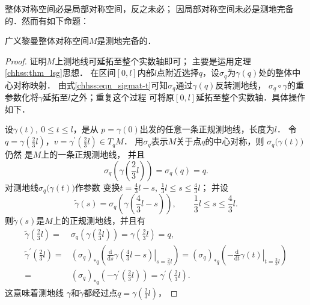 整体对称空间必是局部对称空间，反之未必；
因局部对称空间未必是测地完备的．然而有如下命题：
\begin{theorem}\label{chhss:thm_SSC}
    广义黎曼整体对称空间$M$是测地完备的．
\end{theorem}
\begin{proof}
    证明$M$上测地线可延拓至整个实数轴即可；
    主要是运用定理\ref{chhss:thm_lsg}思想． %
    在区间$[0,l]$内部$l$点附近选择$q$，设$\sigma_q$为$\gamma(q)$处的整体中心对称映射．
    由式\eqref{chhss:eqn_sigmat-t}可知$\sigma_q$通过$\gamma(q)$反转测地线，
    $\sigma_q \circ \gamma$的重参数化将$\gamma$延拓至$l$之外；重复这个过程
    可将原$[0,l]$延拓至整个实数轴．具体操作如下．

    设$\gamma(t),\ 0 \leqslant t \leqslant l$，是从 $p=\gamma(0)$出发的任意一条正规测地线，长度为$l$．
    令$q=\gamma(\frac{2}{3} l)$，$v=\gamma^{\prime}(\frac{2}{3} l) \in T_q M$．
    用$\sigma_q$表示$M$关于点$q$的中心对称，则 $\sigma_q\bigl(\gamma(t)\bigr)$仍然
    是$M$上的一条正规测地线，   并且
    \begin{equation*}
        \sigma_q\left(\gamma\left(\frac{2}{3} l\right)\right)=\sigma_q(q)=q .
    \end{equation*}
    对测地线$\sigma_q\bigl(\gamma(t)\bigr)$作参数
    变换$t=\frac{4}{3} l-s, \ \frac{1}{3} l \leqslant s \leqslant \frac{4}{3} l $；    并设
    \begin{equation}
       \tilde{\gamma}(s)=\sigma_q\left(\gamma\left(\frac{4}{3} l-s\right)\right),
        \qquad \frac{1}{3} l \leqslant s \leqslant \frac{4}{3} l .
    \end{equation}
    则$\tilde{\gamma}(s)$是$M$上的正规测地线，并且有
    \begin{align*}
        \tilde{\gamma}\left(\frac{2}{3} l\right)  =&\sigma_q\left(\gamma\left(
          \frac{2}{3} l\right)\right)=\gamma\left(\frac{2}{3} l\right)=q, \\
        \tilde{\gamma}^{\prime}\left(\frac{2}{3} l\right)  =& 
          \left(\sigma_q\right)_{* q}\left(\left.\frac{\mathrm{d}}{\mathrm{d} s} 
          \gamma\left(\frac{4}{3} l-s\right)\right|_{s=\frac{2}{3} l}\right) 
         =\left(\sigma_q\right)_{* q}\left(-\left.\frac{\mathrm{d}}{\mathrm{d} t}
          \gamma(t)\right|_{t=\frac{2}{3} l}\right) \\
         =&\left(\sigma_q\right)_{* q}\left(-\gamma^{\prime}
         \left(\frac{2}{3} l\right)\right)=\gamma^{\prime}\left(\frac{2}{3} l\right) .
    \end{align*}
    这意味着测地线 $\gamma$和$\tilde{\gamma}$都经过点$q=\gamma(\frac{2}{3} l)$，

\end{proof}

